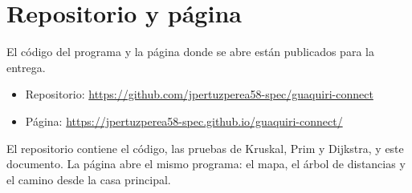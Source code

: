 \documentclass[12pt,a4paper]{article}
\begin{document}
\section*{Repositorio y página}

El código del programa y la página donde se abre están publicados para la entrega.

\begin{itemize}
  \item Repositorio: \url{https://github.com/jpertuzperea58-spec/guaquiri-connect}
  \item Página: \url{https://jpertuzperea58-spec.github.io/guaquiri-connect/}
\end{itemize}

El repositorio contiene el código, las pruebas de Kruskal, Prim y Dijkstra, y este documento. La página abre el mismo programa: el mapa, el árbol de distancias y el camino desde la casa principal.
\end{document}
